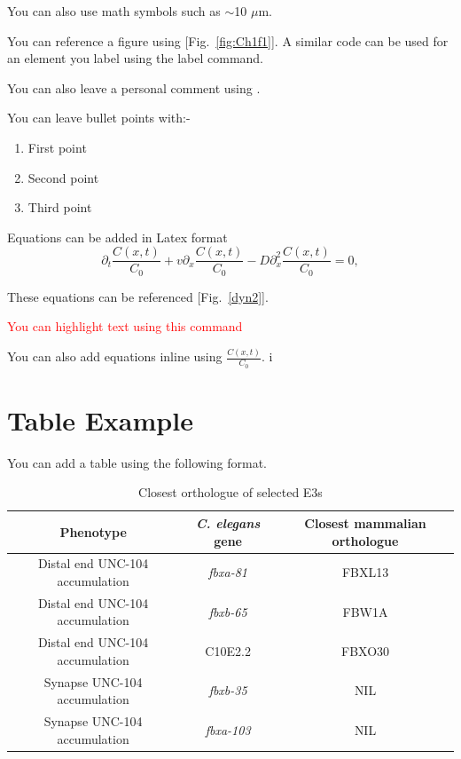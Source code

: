 You can also use math symbols such as $\sim$10 $\mu$m.

You can reference a figure using [Fig.~\ref{fig:Ch1f1}]. A similar code can be used for an element you label using the label command.

You can also leave a personal comment using .

You can leave bullet points with:-
\begin{enumerate}
	\item First point 
	
	\item Second point

	\item Third point

\end{enumerate}


Equations can be added in Latex format
\begin{equation}
	\label{dyn2}
	\partial_t \frac{C(x,t)}{C_{0}} + v \partial_x \frac{C(x,t)}{C_{0}}  - D \partial_x^2 \frac{C(x,t)}{C_{0}}  = 0, \nonumber
\end{equation}

These equations can be referenced [Fig.~\ref{dyn2}]. 

\textcolor{red}{You can highlight text using this command}

You can also add equations inline using  $\frac{C(x,t)}{C_{0}}$. i

\section{Table Example}
\blindtext {}

You can add a table using the following format.
\begin{table}[ht]
	\centering
	\caption{Closest orthologue of selected E3s} \label{tab:E3sselected}
	\begin{tabular}{|c|c|c|}
		\hline 
		Phenotype	& \textit{C. elegans} gene& Closest mammalian orthologue \\[0.5ex] 
		\hline\hline 
		Distal end UNC-104 accumulation	& \textit{fbxa-81} & FBXL13 \\ 
		\hline 
		Distal end UNC-104 accumulation	& \textit{fbxb-65} & FBW1A\\ 
		\hline 
		Distal end UNC-104 accumulation	& C10E2.2& FBXO30\\ 
		\hline 
		Synapse UNC-104 accumulation & \textit{fbxb-35}& NIL\\ 
		\hline 
		Synapse UNC-104 accumulation & \textit{fbxa-103}& NIL\\ 
		\hline 
	\end{tabular}
	
\end{table}
\blindtext 



